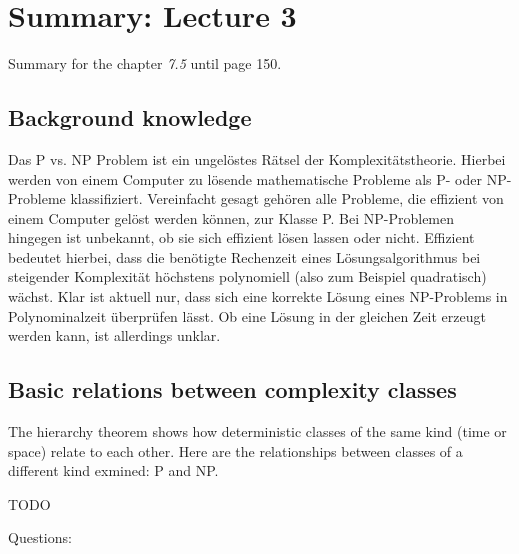 \documentclass[a4]{scrartcl}
\begin{document}




\section*{Summary: Lecture 3}

Summary for the chapter \textit{7.5} until page 150. \cite{book}




\subsection*{Background knowledge}


Das P vs. NP Problem ist ein ungelöstes Rätsel der Komplexitätstheorie.
Hierbei werden von einem Computer zu lösende mathematische Probleme als P- oder NP-Probleme klassifiziert. Vereinfacht gesagt gehören alle Probleme, die effizient von einem Computer gelöst werden können, zur Klasse P. Bei NP-Problemen hingegen ist unbekannt, ob sie sich effizient lösen lassen oder nicht. Effizient bedeutet hierbei, dass die benötigte Rechenzeit eines Lösungsalgorithmus bei steigender Komplexität höchstens polynomiell (also zum Beispiel quadratisch) wächst. Klar ist aktuell nur, dass sich eine korrekte Lösung eines NP-Problems in Polynominalzeit überprüfen lässt. Ob eine Lösung in der gleichen Zeit erzeugt werden kann, ist allerdings unklar.

\cite{DD, book}






\subsection*{Basic relations between complexity classes}


The hierarchy theorem shows how deterministic classes of the same kind (time or space) relate to each other.
Here are the relationships between classes of a different kind exmined: P and NP.


\color{red} TODO
\color{black}

\color{violet} Questions:
\color{black}
\end{document}
